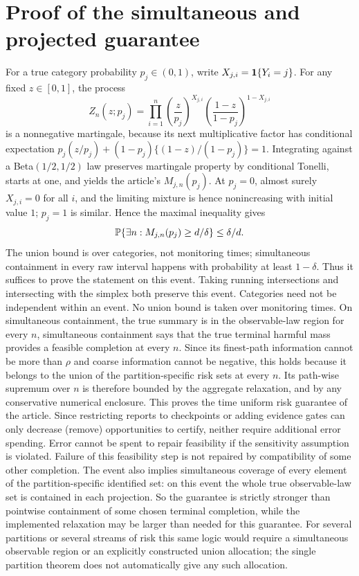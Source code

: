 \section{Proof of the simultaneous and projected guarantee}
For a true category probability $p_j\in(0,1)$, write $X_{j,i}=\mathbf 1\{Y_i=j\}$. For any fixed $z\in[0,1]$, the process
\begin{equation}
 Z_n(z;p_j)=\prod_{i=1}^n
 \left(\frac z{p_j}\right)^{X_{j,i}}
 \left(\frac{1-z}{1-p_j}\right)^{1-X_{j,i}}
\end{equation}
is a nonnegative martingale, because its next multiplicative factor has conditional expectation $p_j(z/p_j)+(1-p_j)\{(1-z)/(1-p_j)\}=1$. Integrating against a Beta$(1/2,1/2)$ law preserves martingale property by conditional Tonelli, starts at one, and yields the article's $M_{j,n}(p_j)$. At $p_j=0$, almost surely $X_{j,i}=0$ for all $i$, and the limiting mixture is hence nonincreasing with initial value $1$; $p_j=1$ is similar. Hence the maximal inequality gives 
\begin{equation}
 \mathbb P\{\exists n:M_{j,n}(p_j)\ge d/\delta\}\le\delta/d.
\end{equation}
The union bound is over categories, not monitoring times; simultaneous containment in every raw interval happens with probability at least $1-\delta$. Thus it suffices to prove the statement on this event. Taking running intersections and intersecting with the simplex both preserve this event. Categories need not be independent within an event. No union bound is taken over monitoring times.
On simultaneous containment, the true summary is in the observable-law region for every $n$, simultaneous containment says that the true terminal harmful mass provides a feasible completion at every $n$. Since its finest-path information cannot be more than $\rho$ and coarse information cannot be negative, this holds because it belongs to the union of the partition-specific risk sets at every $n$. Its path-wise supremum over $n$ is therefore bounded by the aggregate relaxation, and by any conservative numerical enclosure. This proves the time uniform risk guarantee of the article. Since restricting reports to checkpoints or adding evidence gates can only decrease (remove) opportunities to certify, neither require additional error spending. Error cannot be spent to repair feasibility if the sensitivity assumption is violated.
Failure of this feasibility step is not repaired by compatibility of some other completion. The event also implies simultaneous coverage of every element of the partition-specific identified set: on this event the whole true observable-law set is contained in each projection. So the guarantee is strictly stronger than pointwise containment of some chosen terminal completion, while the implemented relaxation may be larger than needed for this guarantee. For several partitions or several streams of risk this same logic would require a simultaneous observable region or an explicitly constructed union allocation; the single partition theorem does not automatically give any such allocation.

